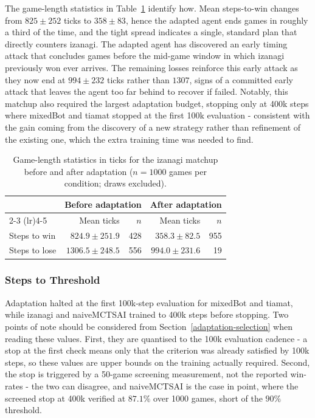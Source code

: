 \documentclass[sigconf,review=false]{acmart}
\begin{document}
The game-length statistics in Table~\ref{tab:izanagi-steps} identify how. 
Mean steps-to-win changes from $825 \pm 252$ ticks to $358 \pm 83$, hence the adapted agent ends games in roughly a third of the time, and the tight spread indicates a single, standard plan that directly counters izanagi. 
The adapted agent has discovered an early timing attack that concludes games before the mid-game window in which izanagi previously won ever arrives. 
The remaining losses reinforce this early attack as they now end at $994 \pm 232$ ticks rather than $1307$, signs of a committed early attack that leaves the agent too far behind to recover if failed. 
Notably, this matchup also required the largest adaptation budget, stopping only at 400k steps where mixedBot and tiamat stopped at the first 100k evaluation -  consistent with the gain coming from the discovery of a new strategy rather than refinement of the existing one, which the extra training time was needed to find.

\begin{table}[t]
  \caption{Game-length statistics in ticks for the izanagi matchup before and after adaptation ($n = 1000$ games per condition; draws excluded).}
  \label{tab:izanagi-steps}
  \begin{tabular}{lrrrr}
    \toprule
    & \multicolumn{2}{c}{Before adaptation}
    & \multicolumn{2}{c}{After adaptation} \\
    \cmidrule(lr){2-3} \cmidrule(lr){4-5}
    & Mean ticks & $n$ & Mean ticks & $n$ \\
    \midrule
    Steps to win  &  $824.9 \pm 251.9$ & 428 & $358.3 \pm 82.5$  & 955 \\
    Steps to lose & $1306.5 \pm 248.5$ & 556 & $994.0 \pm 231.6$ &  19 \\
    \bottomrule
  \end{tabular}
\end{table}

\subsubsection{Steps to Threshold}
Adaptation halted at the first 100k-step evaluation for mixedBot and tiamat, while izanagi and naiveMCTSAI trained to 400k steps before stopping. 
Two points of note should be considered from Section~\ref{adaptation-selection} when reading these values. 
First, they are quantised to the 100k evaluation cadence - a stop at the first check means only that the criterion was already satisfied by 100k steps, so these values are upper bounds on the training actually required. 
Second, the stop is triggered by a 50-game screening measurement, not the reported win-rates - the two can disagree, and naiveMCTSAI is the case in point, where the screened stop at 400k verified at $87.1\%$ over 1000 games, short of the $90\%$ threshold.
\end{document}
